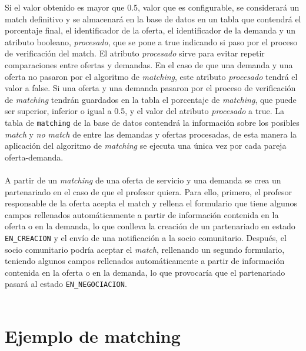 \documentclass[11pt]{book}
\begin{document}
Si el valor obtenido es mayor que 0.5, valor que es configurable, se considerará un match definitivo y se almacenará en la base de datos en un tabla que contendrá el porcentaje final, el identificador de la oferta, el identificador de la demanda y un atributo booleano, \emph{procesado}, que se pone a true indicando si paso por el proceso de verificación del match. 
El atributo \emph{procesado} sirve para evitar repetir comparaciones entre ofertas y demandas. En el caso de que una demanda y una oferta no pasaron por el algoritmo de \emph{matching}, este atributo \emph{procesado} tendrá el valor a false. Si una oferta y una demanda pasaron por el proceso de verificación de \emph{matching} tendrán guardados en la tabla el porcentaje de \emph{matching}, que puede ser superior, inferior o igual a 0.5, y el valor del atributo \emph{procesado} a true. La tabla de \texttt{matching} de la base de datos contendrá la información sobre los posibles \emph{match} y \emph{no match} de entre las demandas y ofertas procesadas, de esta manera la aplicación del algoritmo de \emph{matching} se ejecuta una única vez por cada pareja oferta-demanda. \\\\

A partir de un \emph{matching} de una oferta de servicio y una demanda se crea un partenariado en el caso de que el profesor quiera. Para ello, primero, el profesor responsable de la oferta acepta el match y rellena el formulario que tiene  algunos campos rellenados automáticamente a partir de información contenida en la oferta o en la demanda, lo que conlleva la creación de un partenariado en estado \texttt{EN\_CREACION} y el envío de una notificación a la socio comunitario. Después, el socio comunitario podría aceptar el \emph{match}, rellenando un segundo formulario, teniendo algunos campos rellenados automáticamente a partir de información contenida en la oferta o en la demanda, lo que provocaría que el partenariado pasará al estado \texttt{EN\_NEGOCIACION}.\\\\

\section{Ejemplo de matching}
\end{document}
